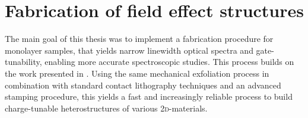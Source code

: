 \chapter{Fabrication of field effect structures}\label{exfoliation}

The main goal of this thesis was to implement a fabrication procedure for \tmdg monolayer samples, that yields narrow linewidth optical spectra and gate-tunability, enabling more accurate spectroscopic studies. This process builds on the work presented in \cite{funk_spectroscopy_2017}. Using the same mechanical exfoliation process in combination with standard contact lithography techniques and an advanced stamping procedure, this yields a fast and increasingly reliable process to build charge-tunable heterostructures of various \textsc{2d}-materials. 

